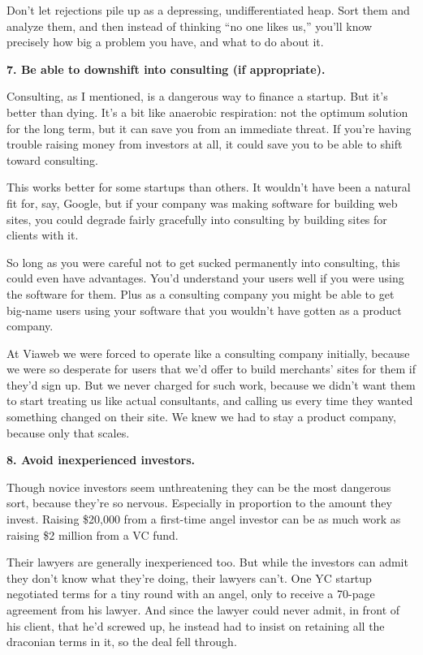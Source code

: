 \documentclass[12pt]{book}
\begin{document}
Don't let rejections pile up as a depressing, undifferentiated heap.
Sort them and analyze them, and then instead of thinking ``no one likes
us,'' you'll know precisely how big a problem you have, and what to do
about it.

\textbf{7. Be able to downshift into consulting (if appropriate).}

Consulting, as I mentioned, is a dangerous way to finance a startup. But
it's better than dying. It's a bit like anaerobic respiration: not the
optimum solution for the long term, but it can save you from an
immediate threat. If you're having trouble raising money from investors
at all, it could save you to be able to shift toward consulting.

This works better for some startups than others. It wouldn't have been a
natural fit for, say, Google, but if your company was making software
for building web sites, you could degrade fairly gracefully into
consulting by building sites for clients with it.

So long as you were careful not to get sucked permanently into
consulting, this could even have advantages. You'd understand your users
well if you were using the software for them. Plus as a consulting
company you might be able to get big-name users using your software that
you wouldn't have gotten as a product company.

At Viaweb we were forced to operate like a consulting company initially,
because we were so desperate for users that we'd offer to build
merchants' sites for them if they'd sign up. But we never charged for
such work, because we didn't want them to start treating us like actual
consultants, and calling us every time they wanted something changed on
their site. We knew we had to stay a product company, because only that
scales.

\textbf{8. Avoid inexperienced investors.}

Though novice investors seem unthreatening they can be the most
dangerous sort, because they're so nervous. Especially in proportion to
the amount they invest. Raising \$20,000 from a first-time angel
investor can be as much work as raising \$2 million from a VC fund.

Their lawyers are generally inexperienced too. But while the investors
can admit they don't know what they're doing, their lawyers can't. One
YC startup negotiated terms for a tiny round with an angel, only to
receive a 70-page agreement from his lawyer. And since the lawyer could
never admit, in front of his client, that he'd screwed up, he instead
had to insist on retaining all the draconian terms in it, so the deal
fell through.
\end{document}
